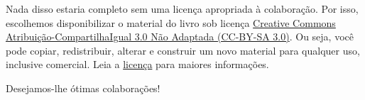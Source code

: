 Nada disso estaria completo sem uma licença apropriada à colaboração. Por isso, escolhemos disponibilizar o material do livro sob licença \href{https://creativecommons.org/licenses/by-sa/3.0/}{Creative Commons Atribuição-CompartilhaIgual 3.0 Não Adaptada (CC-BY-SA 3.0)}. Ou seja, você pode copiar, redistribuir, alterar e construir um novo material para qualquer uso, inclusive comercial. Leia a \href{https://creativecommons.org/licenses/by-sa/3.0/}{licença} para maiores informações.

\vspace{0.5cm}

Desejamos-lhe ótimas colaborações!
